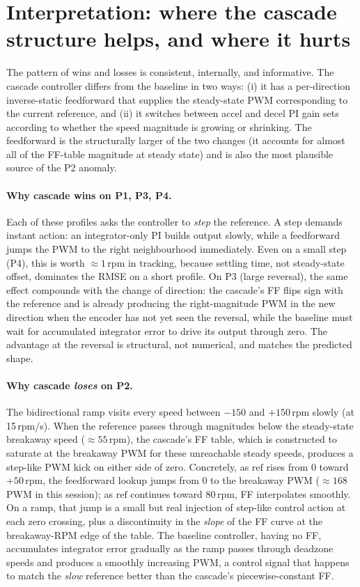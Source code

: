 \section{Interpretation: where the cascade structure helps, and where it hurts}
\label{sec:cl-interp}

The pattern of wins and losses is consistent, internally, and informative. The cascade controller differs from the baseline in two ways: (i) it has a per-direction inverse-static feedforward that supplies the steady-state PWM corresponding to the current reference, and (ii) it switches between accel and decel PI gain sets according to whether the speed magnitude is growing or shrinking. The feedforward is the structurally larger of the two changes (it accounts for almost all of the FF-table magnitude at steady state) and is also the most plausible source of the P2 anomaly.

\paragraph{Why cascade wins on P1, P3, P4.} Each of these profiles asks the controller to \emph{step} the reference. A step demands instant action: an integrator-only PI builds output slowly, while a feedforward jumps the PWM to the right neighbourhood immediately. Even on a small step (P4), this is worth ${\approx}1$\,rpm in tracking, because settling time, not steady-state offset, dominates the RMSE on a short profile. On P3 (large reversal), the same effect compounds with the change of direction: the cascade's FF flips sign with the reference and is already producing the right-magnitude PWM in the new direction when the encoder has not yet seen the reversal, while the baseline must wait for accumulated integrator error to drive its output through zero. The advantage at the reversal is structural, not numerical, and matches the predicted shape.

\paragraph{Why cascade \emph{loses} on P2.} The bidirectional ramp visits every speed between $-150$ and $+150$\,rpm slowly (at 15\,rpm/s). When the reference passes through magnitudes below the steady-state breakaway speed (${\approx}55$\,rpm), the cascade's FF table, which is constructed to saturate at the breakaway PWM for these unreachable steady speeds, produces a step-like PWM kick on either side of zero. Concretely, as $\text{ref}$ rises from 0 toward $+50$\,rpm, the feedforward lookup jumps from 0 to the breakaway PWM (${\approx}168$\,PWM in this session); as $\text{ref}$ continues toward 80\,rpm, FF interpolates smoothly. On a ramp, that jump is a small but real injection of step-like control action at each zero crossing, plus a discontinuity in the \emph{slope} of the FF curve at the breakaway-RPM edge of the table. The baseline controller, having no FF, accumulates integrator error gradually as the ramp passes through deadzone speeds and produces a smoothly increasing PWM, a control signal that happens to match the \emph{slow} reference better than the cascade's piecewise-constant FF.

